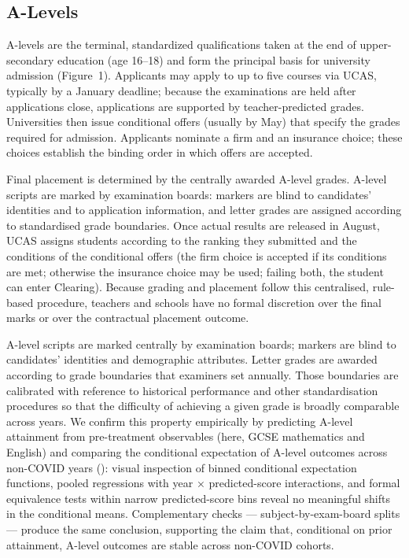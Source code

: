 
\subsection{A-Levels}

A-levels are the terminal, standardized qualifications taken at the end of upper-secondary education (age 16–18) and form the principal basis for university admission (Figure~1). Applicants may apply to up to five courses via UCAS, typically by a January deadline; because the examinations are held after applications close, applications are supported by teacher-predicted grades. Universities then issue conditional offers (usually by May) that specify the grades required for admission. Applicants nominate a firm and an insurance choice; these choices establish the binding order in which offers are accepted.

Final placement is determined by the centrally awarded A-level grades. A-level scripts are marked by examination boards: markers are blind to candidates' identities and to application information, and letter grades are assigned according to standardised grade boundaries. Once actual results are released in August, UCAS assigns students according to the ranking they submitted and the conditions of the conditional offers (the firm choice is accepted if its conditions are met; otherwise the insurance choice may be used; failing both, the student can enter Clearing). Because grading and placement follow this centralised, rule-based procedure, teachers and schools have no formal discretion over the final marks or over the contractual placement outcome.

A-level scripts are marked centrally by examination boards; markers are blind to candidates' identities and demographic attributes. Letter grades are awarded according to grade boundaries that examiners set annually. Those boundaries are calibrated with reference to historical performance and other standardisation procedures so that the difficulty of achieving a given grade is broadly comparable across years. We confirm this property empirically by predicting A-level attainment from pre-treatment observables (here, GCSE mathematics and English) and comparing the conditional expectation of A-level outcomes across non-COVID years (): visual inspection of binned conditional expectation functions, pooled regressions with year × predicted-score interactions, and formal equivalence tests within narrow predicted-score bins reveal no meaningful shifts in the conditional means. Complementary checks — subject-by-exam-board splits — produce the same conclusion, supporting the claim that, conditional on prior attainment, A-level outcomes are stable across non-COVID cohorts.

